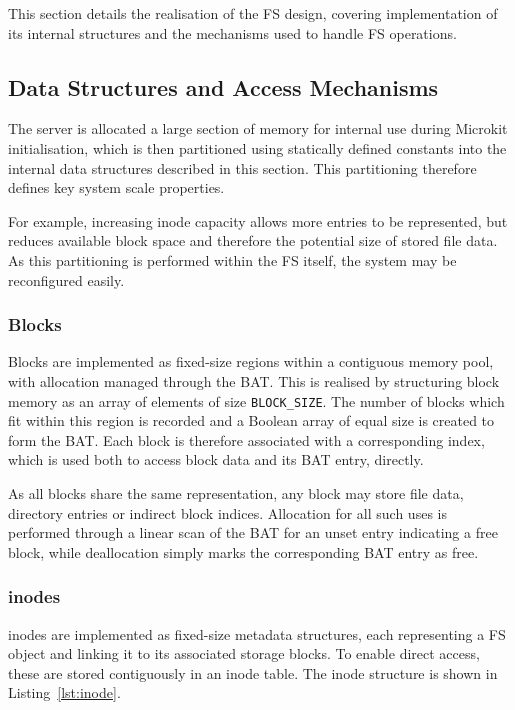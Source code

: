 This section details the realisation of the FS design, covering implementation of its internal structures and the mechanisms used to handle FS operations.

\subsection{Data Structures and Access Mechanisms}

The server is allocated a large section of memory for internal use during Microkit initialisation, which is then partitioned using statically defined constants into the internal data structures described in this section. This partitioning therefore defines key system scale properties. 

For example, increasing inode capacity allows more entries to be represented, but reduces available block space and therefore the potential size of stored file data. As this partitioning is performed within the FS itself, the system may be reconfigured easily.

\subsubsection{Blocks}

Blocks are implemented as fixed-size regions within a contiguous memory pool, with allocation managed through the BAT. This is realised by structuring block memory as an array of elements of size \texttt{BLOCK\_SIZE}. The number of blocks which fit within this region is recorded and a Boolean array of equal size is created to form the BAT. Each block is therefore associated with a corresponding index, which is used both to access block data and its BAT entry, directly.

As all blocks share the same representation, any block may store file data, directory entries or indirect block indices. Allocation for all such uses is performed through a linear scan of the BAT for an unset entry indicating a free block, while deallocation simply marks the corresponding BAT entry as free.

\vspace{-0.1cm}
\subsubsection{inodes}

inodes are implemented as fixed-size metadata structures, each representing a FS object and linking it to its associated storage blocks. To enable direct access, these are stored contiguously in an inode table. The inode structure is shown in Listing~\ref{lst:inode}.

